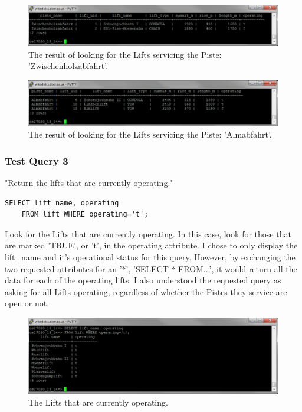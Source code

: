 \documentclass[11pt]{scrartcl} %
\begin{document}
\begin{figure}[H]
  \centering
    \includegraphics[width=1\textwidth]{IMG/query_2_1.png}
 \caption{The result of looking for the Lifts servicing the Piste: 'Zwischenholzabfahrt'.}
\end{figure}

\begin{figure}[H]
  \centering
    \includegraphics[width=1\textwidth]{IMG/query_2_2.png}
 \caption{The result of looking for the Lifts servicing the Piste: 'Almabfahrt'.}
\end{figure}

\subsubsection{Test Query 3}
"Return the lifts that are currently operating."
\begin{lstlisting}
SELECT lift_name, operating 
	FROM lift WHERE operating='t';
\end{lstlisting}
Look for the Lifts that are currently operating. In this case, look for those that are marked 'TRUE', or 't', in the operating attribute. I chose to only display the lift\_name and it's operational status for this query. However, by exchanging the two requested attributes for an '*', 'SELECT * FROM...', it would return all the data for each of the operating lifts. I also understood the requested query as asking for all Lifts operating, regardless of whether the Pistes they service are open or not.

\begin{figure}[H]
  \centering
    \includegraphics[width=1\textwidth]{IMG/query_3_1.png}
 \caption{The Lifts that are currently operating.}
\end{figure}
\end{document}
